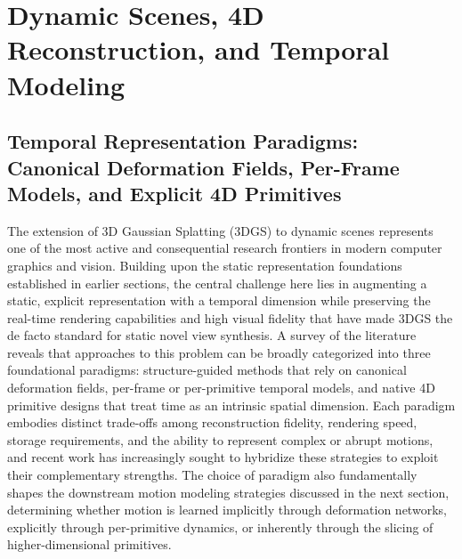 \documentclass[11pt]{article}
\begin{document}
\section{Dynamic Scenes, 4D Reconstruction, and Temporal Modeling}

\subsection{Temporal Representation Paradigms: Canonical Deformation Fields, Per-Frame Models, and Explicit 4D Primitives}

The extension of 3D Gaussian Splatting (3DGS) to dynamic scenes represents one of the most active and consequential research frontiers in modern computer graphics and vision. Building upon the static representation foundations established in earlier sections, the central challenge here lies in augmenting a static, explicit representation with a temporal dimension while preserving the real-time rendering capabilities and high visual fidelity that have made 3DGS the de facto standard for static novel view synthesis. A survey of the literature reveals that approaches to this problem can be broadly categorized into three foundational paradigms: structure-guided methods that rely on canonical deformation fields, per-frame or per-primitive temporal models, and native 4D primitive designs that treat time as an intrinsic spatial dimension. Each paradigm embodies distinct trade-offs among reconstruction fidelity, rendering speed, storage requirements, and the ability to represent complex or abrupt motions, and recent work has increasingly sought to hybridize these strategies to exploit their complementary strengths. The choice of paradigm also fundamentally shapes the downstream motion modeling strategies discussed in the next section, determining whether motion is learned implicitly through deformation networks, explicitly through per-primitive dynamics, or inherently through the slicing of higher-dimensional primitives.
\end{document}
